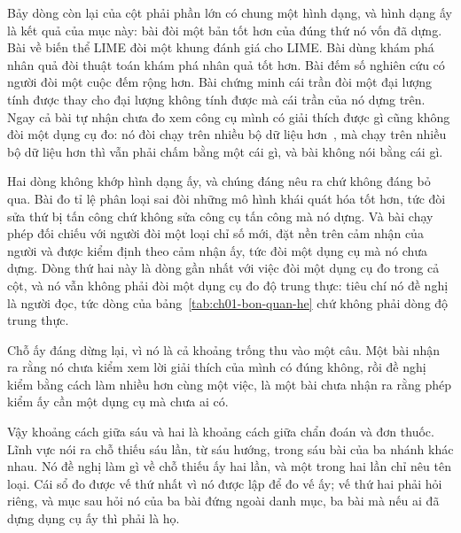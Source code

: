 %
Bảy dòng còn lại của cột phải phần lớn có chung một hình dạng, và hình dạng ấy là
kết quả của mục này: bài đòi một bản tốt hơn của đúng thứ nó vốn đã dựng. Bài về
biến thể LIME đòi một khung đánh giá cho LIME. Bài dùng khám phá nhân quả đòi
thuật toán khám phá nhân quả tốt hơn. Bài đếm số nghiên cứu có người đòi một cuộc
đếm rộng hơn. Bài chứng minh cái trần đòi một đại lượng tính được thay cho đại
lượng không tính được mà cái trần của nó dựng trên. Ngay cả bài tự nhận chưa đo
xem công cụ mình có giải thích được gì cũng không đòi một dụng cụ đo: nó đòi chạy
trên nhiều bộ dữ liệu hơn~\autocite{p27shlime}, mà chạy trên nhiều bộ dữ liệu hơn
thì vẫn phải chấm bằng một cái gì, và bài không nói bằng cái gì.

Hai dòng không khớp hình dạng ấy, và chúng đáng nêu ra chứ không đáng bỏ qua. Bài
đo tỉ lệ phân loại sai đòi những mô hình khái quát hóa tốt hơn, tức đòi sửa thứ
bị tấn công chứ không sửa công cụ tấn công mà nó dựng. Và bài chạy phép đối chiếu
với người đòi một loại chỉ số mới, đặt nền trên cảm nhận của người và được kiểm
định theo cảm nhận ấy, tức đòi một dụng cụ mà nó chưa dựng. Dòng thứ hai này là
dòng gần nhất với việc đòi một dụng cụ đo trong cả cột, và nó vẫn không phải đòi một dụng cụ đo độ trung
thực: tiêu chí nó đề nghị là người đọc, tức dòng 
của bảng~\ref{tab:ch01-bon-quan-he} chứ không phải dòng độ trung thực.

Chỗ ấy đáng dừng lại, vì nó là cả khoảng trống thu vào một câu. Một bài nhận ra
rằng nó chưa kiểm xem lời giải thích của mình có đúng không, rồi đề nghị kiểm
bằng cách làm nhiều hơn cùng một việc, là một bài chưa nhận ra rằng phép kiểm ấy
cần một dụng cụ mà chưa ai có.

%
Vậy khoảng cách giữa sáu và hai là khoảng cách giữa chẩn đoán và đơn thuốc. Lĩnh
vực nói ra chỗ thiếu sáu lần, từ sáu hướng, trong sáu bài của ba nhánh khác nhau.
Nó đề nghị làm gì về chỗ thiếu ấy hai lần, và một trong hai lần chỉ nêu tên loại.
Cái sổ đo được vế thứ nhất vì nó được lập để đo vế ấy; vế thứ hai phải hỏi riêng,
và mục sau hỏi nó của ba bài đứng ngoài danh mục, ba bài mà nếu ai đã dựng dụng
cụ ấy thì phải là họ.

